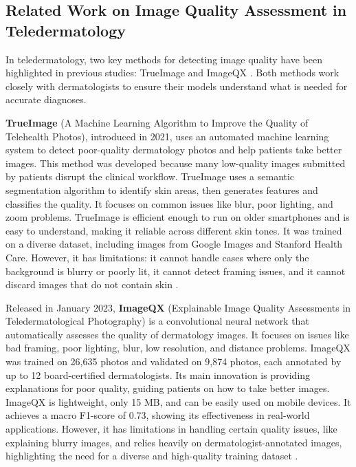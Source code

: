 \subsection{Related Work on Image Quality Assessment in Teledermatology}
\label{sub:ApproachesIQAinTeledermatology}
In teledermatology, two key methods for detecting image quality have been highlighted in previous studies: TrueImage \autocite{TrueImage} and ImageQX \autocite{ImageQX}. Both methods work closely with dermatologists to ensure their models understand what is needed for accurate diagnoses. \par
\vspace{\baselineskip}
\noindent
\textbf{TrueImage} (A Machine Learning Algorithm to Improve the Quality of Telehealth Photos), introduced in 2021, uses an automated machine learning system to detect poor-quality dermatology photos and help patients take better images. This method was developed because many low-quality images submitted by patients disrupt the clinical workflow. TrueImage uses a semantic segmentation algorithm to identify skin areas, then generates features and classifies the quality. It focuses on common issues like blur, poor lighting, and zoom problems. TrueImage is efficient enough to run on older smartphones and is easy to understand, making it reliable across different skin tones. It was trained on a diverse dataset, including images from Google Images and Stanford Health Care. However, it has limitations: it cannot handle cases where only the background is blurry or poorly lit, it cannot detect framing issues, and it cannot discard images that do not contain skin \autocite{TrueImage}.\par
\vspace{\baselineskip}
\noindent
Released in January 2023, \textbf{ImageQX} (Explainable Image Quality Assessments in Teledermatological Photography)
is a convolutional neural network that automatically assesses the quality of dermatology images. It focuses on issues like bad framing, poor lighting, blur, low resolution, and distance problems. ImageQX was trained on 26,635 photos and validated on 9,874 photos, each annotated by up to 12 board-certified dermatologists. Its main innovation is providing explanations for poor quality, guiding patients on how to take better images. ImageQX is lightweight, only 15 MB, and can be easily used on mobile devices. It achieves a macro F1-score of 0.73, showing its effectiveness in real-world applications.  However, it has limitations in handling certain quality issues, like explaining blurry images, and relies heavily on dermatologist-annotated images, highlighting the need for a diverse and high-quality training dataset \autocite{ImageQX}.
